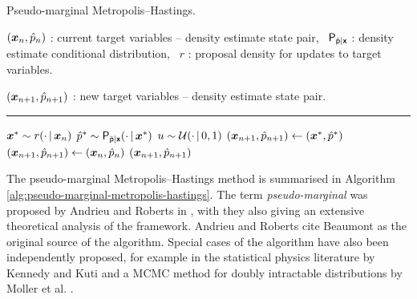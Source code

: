 \begin{algorithm}[!t]
\caption{Pseudo-marginal Metropolis--Hastings.}
\label{alg:pseudo-marginal-metropolis-hastings}
\begin{algorithmic}
\small
    \Require
    $(\boldsymbol{x}_n, \hat{p}_n)$ : current target variables -- density estimate state pair,~
    $\mathsf{P}_{\hat{\mathsf{p}}|\boldsymbol{\mathsf{x}}}$ : density estimate conditional distribution,~
    $r$ : proposal density for updates to target variables.
    \Ensure\raggedright
    $(\boldsymbol{x}_{n+1}, \hat{p}_{n+1})$ : new target variables -- density estimate state pair.
\end{algorithmic}
\hrule
\small
\begin{algorithmic}[1]
  \State $\boldsymbol{x}^* \sim r(\cdot \operatorname{|} \boldsymbol{x}_n)$ 
  \State $\hat{p}^* \sim \mathsf{P}_{\hat{\mathsf{p}}|\boldsymbol{\mathsf{x}}}(\cdot\operatorname{|}\boldsymbol{x}^*)$ \label{ln:density-estimate} 
  \State $u \sim \mathcal{U}(\cdot \operatorname{|} 0,1)$
    \State $(\boldsymbol{x}_{n+1},\hat{p}_{n+1}) \gets (\boldsymbol{x}^*,\hat{p}^*)$ 
  \Else
    \State  $ (\boldsymbol{x}_{n+1},\hat{p}_{n+1}) \gets (\boldsymbol{x}_n,\hat{p}_n)$ 
  \EndIf
  \State \Return $(\boldsymbol{x}_{n+1},\hat{p}_{n+1})$
\end{algorithmic}
\end{algorithm}

The pseudo-marginal Metropolis--Hastings method is summarised in Algorithm \ref{alg:pseudo-marginal-metropolis-hastings}. The term \emph{pseudo-marginal} was proposed by Andrieu and Roberts in \citep{andrieu2009pseudo}, with they also giving an extensive theoretical analysis of the framework. Andrieu and Roberts cite Beaumont \citep{beaumont2003estimation} as the original source of the algorithm. Special cases of the algorithm have also been independently proposed, for example in the statistical physics literature by Kennedy and Kuti \citep{kennedy1985noise} and a \ac{MCMC} method for doubly intractable distributions by Moller et al. \citep{moller2006efficient}.

